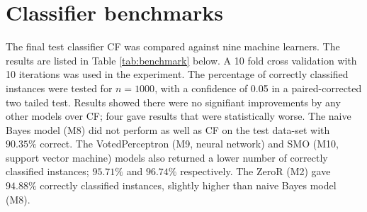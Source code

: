 \clearpage

\section{Classifier benchmarks}\label{sec:results-classifier-benchmarks}
The final test classifier CF was compared against nine machine learners. The results are listed in Table \ref{tab:benchmark} below. A 10 fold cross validation with 10 iterations was used in the experiment. The percentage of correctly classified instances were tested for $ n = 1000 $, with a confidence of 0.05 in a paired-corrected two tailed test. Results showed there were no signifiant improvements by any other models over CF; four gave results that were statistically worse. The naive Bayes model (M8) did not perform as well as CF on the test data-set with $ 90.35\% $ correct. The VotedPerceptron (M9, neural network) and SMO (M10, support vector machine) models also returned a lower number of correctly classified instances; $95.71\% $ and $96.74\%$ respectively. The ZeroR (M2) gave $ 94.88\%  $ correctly classified instances, slightly higher than naive Bayes model (M8).


